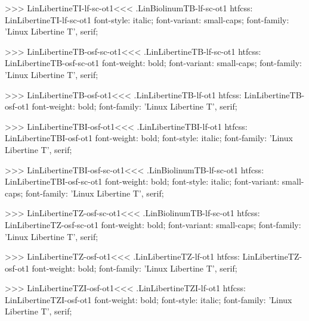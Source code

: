 {{{{{{{>>>
\<LinLibertineTI-lf-sc-ot1\><<<
.LinBiolinumTB-lf-sc-ot1
htfcss:  LinLibertineTI-lf-sc-ot1  font-style: italic; font-variant: small-caps; font-family: 'Linux Libertine T', serif;

>>>
\<LinLibertineTB-osf-sc-ot1\><<<
.LinLibertineTB-lf-sc-ot1
htfcss:  LinLibertineTB-osf-sc-ot1  font-weight: bold; font-variant: small-caps; font-family: 'Linux Libertine T', serif;

>>>
\<LinLibertineTB-osf-ot1\><<<
.LinLibertineTB-lf-ot1
htfcss:  LinLibertineTB-osf-ot1  font-weight: bold; font-family: 'Linux Libertine T', serif;

>>>
\<LinLibertineTBI-osf-ot1\><<<
.LinLibertineTBI-lf-ot1
htfcss:  LinLibertineTBI-osf-ot1  font-weight: bold; font-style: italic; font-family: 'Linux Libertine T', serif;

>>>
\<LinLibertineTBI-osf-sc-ot1\><<<
.LinBiolinumTB-lf-sc-ot1
htfcss:  LinLibertineTBI-osf-sc-ot1  font-weight: bold; font-style: italic; font-variant: small-caps; font-family: 'Linux Libertine T', serif;

>>>
\<LinLibertineTZ-osf-sc-ot1\><<<
.LinBiolinumTB-lf-sc-ot1
htfcss:  LinLibertineTZ-osf-sc-ot1  font-weight: bold; font-variant: small-caps; font-family: 'Linux Libertine T', serif;

>>>
\<LinLibertineTZ-osf-ot1\><<<
.LinLibertineTZ-lf-ot1
htfcss:  LinLibertineTZ-osf-ot1  font-weight: bold; font-family: 'Linux Libertine T', serif;

>>>
\<LinLibertineTZI-osf-ot1\><<<
.LinLibertineTZI-lf-ot1
htfcss:  LinLibertineTZI-osf-ot1  font-weight: bold; font-style: italic; font-family: 'Linux Libertine T', serif;

}}}}}}}
